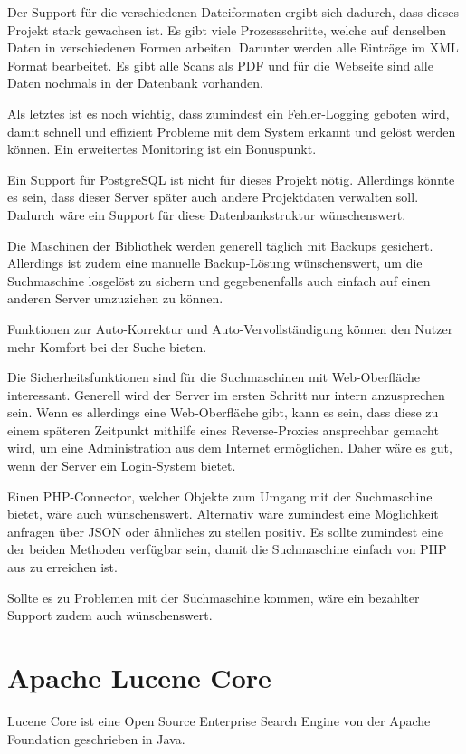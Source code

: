 Der Support für die verschiedenen Dateiformaten ergibt sich dadurch, dass dieses Projekt stark gewachsen ist. Es gibt viele Prozessschritte, welche auf denselben Daten in verschiedenen Formen arbeiten. Darunter werden alle Einträge im XML Format bearbeitet. Es gibt alle Scans als PDF und für die Webseite sind alle Daten nochmals in der Datenbank vorhanden.

Als letztes ist es noch wichtig, dass zumindest ein Fehler-Logging geboten wird, damit schnell und effizient Probleme mit dem System erkannt und gelöst werden können. Ein erweitertes Monitoring ist ein Bonuspunkt.

Ein Support für PostgreSQL ist nicht für dieses Projekt nötig. Allerdings könnte es sein, dass dieser Server später auch andere Projektdaten verwalten soll. Dadurch wäre ein Support für diese Datenbankstruktur wünschenswert.

Die Maschinen der Bibliothek werden generell täglich mit Backups gesichert. Allerdings ist zudem eine manuelle Backup-Lösung wünschenswert, um die Suchmaschine losgelöst zu sichern und gegebenenfalls auch einfach auf einen anderen Server umzuziehen zu können. 

Funktionen zur Auto-Korrektur und Auto-Vervollständigung können den Nutzer mehr Komfort bei der Suche bieten.

Die Sicherheitsfunktionen sind für die Suchmaschinen mit Web-Oberfläche interessant. Generell wird der Server im ersten Schritt nur intern anzusprechen sein. Wenn es allerdings eine Web-Oberfläche gibt, kann es sein, dass diese zu einem späteren Zeitpunkt mithilfe eines Reverse-Proxies ansprechbar gemacht wird, um eine Administration aus dem Internet ermöglichen. Daher wäre es gut, wenn der Server ein Login-System bietet.

Einen PHP-Connector, welcher Objekte zum Umgang mit der Suchmaschine bietet, wäre auch wünschenswert. Alternativ wäre zumindest eine Möglichkeit anfragen über JSON oder ähnliches zu stellen positiv. Es sollte zumindest eine der beiden Methoden verfügbar sein, damit die Suchmaschine einfach von PHP aus zu erreichen ist.

Sollte es zu Problemen mit der Suchmaschine kommen, wäre ein bezahlter Support zudem auch wünschenswert.

\section{Apache Lucene Core}
\label{lucenecore}

Lucene Core ist eine Open Source Enterprise Search Engine von der Apache Foundation geschrieben in Java.

